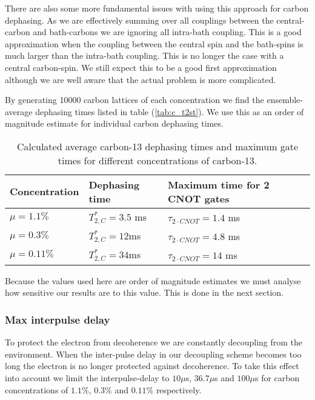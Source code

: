 There are also some more fundamental issues with using this approach for carbon dephasing. As we are effectively summing over all couplings between the central-carbon and bath-carbons we are ignoring all intra-bath coupling. This is a good approximation when the coupling between the central spin and the bath-spins is much larger than the intra-bath coupling. This is no longer the case with a central carbon-spin. We still expect this to be a good first approximation although we are well aware that the actual problem is more complicated. 

By generating 10000 carbon lattices of each concentration we find the ensemble-average dephasing times listed in table (\autoref{tab:c_t2st}). We use this as an order of magnitude estimate for individual carbon dephasing times.
 
\begin{table}
\begin{tabular}{lll}
\label{tab:c_t2st}
Concentration& Dephasing time & Maximum time for 2 CNOT gates \\ \hline
$\mu = 1.1\%$ & $ T_{2,C}^* = 3.5$ ms  & $ \tau_{2 \cdot CNOT } = 1.4$ ms \\
$\mu = 0.3\%$& $ T_{2,C}^* = 12$ms & $ \tau_{2 \cdot CNOT } = 4.8$ ms \\
$\mu = 0.11\%$& $T_{2,C}^* = 34$ms & $ \tau_{2 \cdot CNOT } = 14$ ms \\
\end{tabular}
\caption{Calculated average carbon-13 dephasing times and maximum gate times for different concentrations of carbon-13.}
\end{table}

Because the values used here are order of magnitude estimates we must analyse how sensitive our results are to this value. This is done in the next section. 

\subsubsection{Max interpulse delay}
\label{maxinterpulsedelay}

To protect the electron from decoherence we are constantly decoupling from the environment. When the inter-pulse delay in our decoupling scheme becomes too long the electron is no longer protected against decoherence. To take this effect into account we limit the interpulse-delay to  $10 \mu$s, $36.7\mu$s and $ 100 \mu$s for carbon concentrations of $ 1.1\%$, $0.3\%$ and $0.11 \%$  respectively. 

